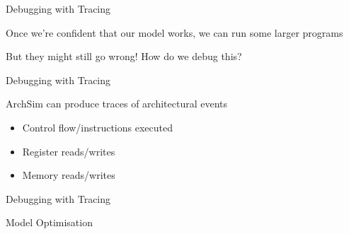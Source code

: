 \begin{frame}{Debugging with Tracing}

Once we're confident that our model works, we can run some larger programs

\pause

But they might still go wrong! How do we debug this?

\end{frame}

\begin{frame}{Debugging with Tracing}

ArchSim can produce traces of architectural events
\begin{itemize}
\item Control flow/instructions executed
\item Register reads/writes
\item Memory reads/writes
\end{itemize}

\end{frame}

\begin{frame}{Debugging with Tracing}

\end{frame}

\begin{frame}{Model Optimisation}

% 

\end{frame}

